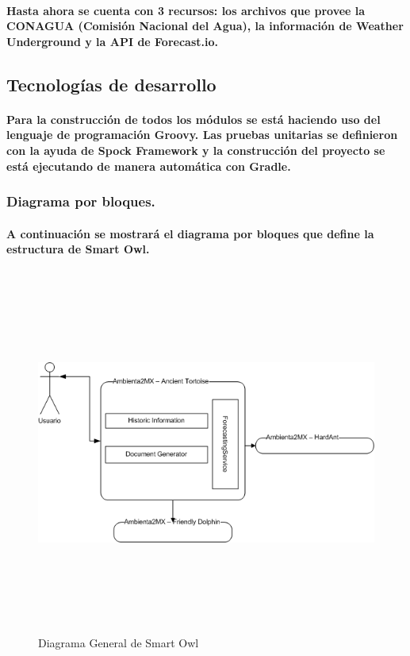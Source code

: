       \paragraph{Hasta ahora se cuenta con 3 recursos: los archivos que provee la CONAGUA (Comisión Nacional del Agua), la información de Weather Underground y la API de Forecast.io.}
      \subsection{Tecnologías de desarrollo}
      \paragraph{Para la construcción de todos los módulos se está haciendo uso del lenguaje de programación Groovy. Las pruebas unitarias se definieron con la ayuda de Spock Framework y la construcción del proyecto se está ejecutando de manera automática con Gradle.}
    \newpage
      \begin{landscape}
      \subsubsection{Diagrama por bloques.}
        \paragraph{A continuación se mostrará el diagrama por bloques que define la estructura de Smart Owl.}
        \begin{figure}[b!]
        \centering
        \includegraphics[width=22.5cm,height=12cm]{./images/DiagramaAncientTortoise.png}
        \caption{Diagrama General de Smart Owl}
      \end{figure}
      \end{landscape}
      \newpage
